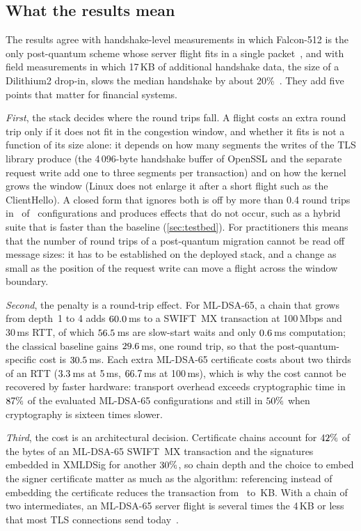 \documentclass[preprint,12pt]{elsarticle}
\newcommand{\ms}{\,ms\xspace}
\newcommand{\KB}{\,KB\xspace}
\begin{document}
\subsection{What the results mean}
The results agree with handshake-level measurements in which Falcon-512 is the only post-quantum scheme whose server flight fits in a single packet~\cite{raavi2025}, and with field measurements in which 17\KB of additional handshake data, the size of a Dilithium2 drop-in, slows the median handshake by about 20\%~\cite{westerbaan2021}. They add five points that matter for financial systems.

\emph{First}, the stack decides where the round trips fall. A flight costs an extra round trip only if it does not fit in the congestion window, and whether it fits is not a function of its size alone: it depends on how many segments the writes of the TLS library produce (the 4\,096-byte handshake buffer of OpenSSL and the separate request write add one to three segments per transaction) and on how the kernel grows the window (Linux does not enlarge it after a short flight such as the ClientHello). A closed form that ignores both is off by more than 0.4 round trips in \tbOffIdeal\ of \tbNConfigs\ configurations and produces effects that do not occur, such as a hybrid suite that is faster than the baseline (\cref{sec:testbed}). For practitioners this means that the number of round trips of a post-quantum migration cannot be read off message sizes: it has to be established on the deployed stack, and a change as small as the position of the request write can move a flight across the window boundary.

\emph{Second}, the penalty is a round-trip effect. For ML-DSA-65, a chain that grows from depth~1 to 4 adds $60.0$\ms to a SWIFT~MX transaction at 100\,Mbps and 30\ms RTT, of which $56.5$\ms are slow-start waits and only $0.6$\ms computation; the classical baseline gains $29.6$\ms, one round trip, so that the post-quantum-specific cost is $30.5$\ms. Each extra ML-DSA-65 certificate costs about two thirds of an RTT ($3.3$\ms at 5\ms, $66.7$\ms at 100\ms), which is why the cost cannot be recovered by faster hardware: transport overhead exceeds cryptographic time in $87\%$ of the evaluated ML-DSA-65 configurations and still in $50\%$ when cryptography is sixteen times slower.

\emph{Third}, the cost is an architectural decision. Certificate chains account for $42\%$ of the bytes of an ML-DSA-65 SWIFT~MX transaction and the signatures embedded in XMLDSig for another $30\%$, so chain depth and the choice to embed the signer certificate matter as much as the algorithm: referencing instead of embedding the certificate reduces the transaction from \swiftKBMLDSAsixtyfive\ to \nocertMLKB\KB. With a chain of two intermediates, an ML-DSA-65 server flight is several times the 4\KB or less that most TLS connections send today~\cite{kampanakis2022}.
\end{document}
